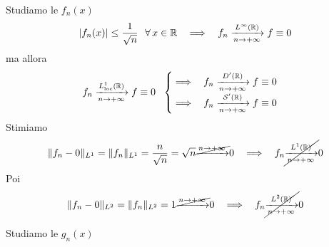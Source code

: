 Studiamo le $f_{n}(x)$
\begin{equation*}
| f_{n}(x)| \leq \frac{1}{\sqrt{n}} \ \ \forall x\in \RR \ \ \implies \ \ f_{n}\xrightarrow[n\rightarrow + \infty ]{L^{\infty}(\RR)} f\equiv 0
\end{equation*}
ma allora
\begin{equation*}
f_{n}\xrightarrow[n\rightarrow + \infty ]{L^{1}_{\operatorname{loc}}(\mathbb{R})} f\equiv 0\ \
\begin{cases}
\implies \ \ f_{n}\xrightarrow[n\rightarrow + \infty ]{D'(\mathbb{R})} f\equiv 0\\
\implies \ \ f_{n}\xrightarrow[n\rightarrow + \infty ]{\mathcal{S} '(\mathbb{R})} f\equiv 0
\end{cases}
\end{equation*}
Stimiamo
\begin{equation*}
\Vert f_{n} - 0\Vert_{L^{1}} = \Vert f_{n}\Vert_{L^{1}} = \frac{n}{\sqrt{n}} = \sqrt{n}\cancel{\xrightarrow{n\rightarrow + \infty}} 0\ \ \implies \ \ f_{n}\cancel{\xrightarrow[n\rightarrow + \infty ]{L^{1}(\RR)}} 0
\end{equation*}
Poi
\begin{equation*}
\Vert f_{n} - 0\Vert_{L^{2}} = \Vert f_{n}\Vert_{L^{2}} = 1\cancel{\xrightarrow{n\rightarrow + \infty}} 0\ \ \implies \ \ f_{n}\cancel{\xrightarrow[n\rightarrow + \infty ]{L^{2}(\mathbb{R})}} 0
\end{equation*}


Studiamo le $g_{n}(x)$

